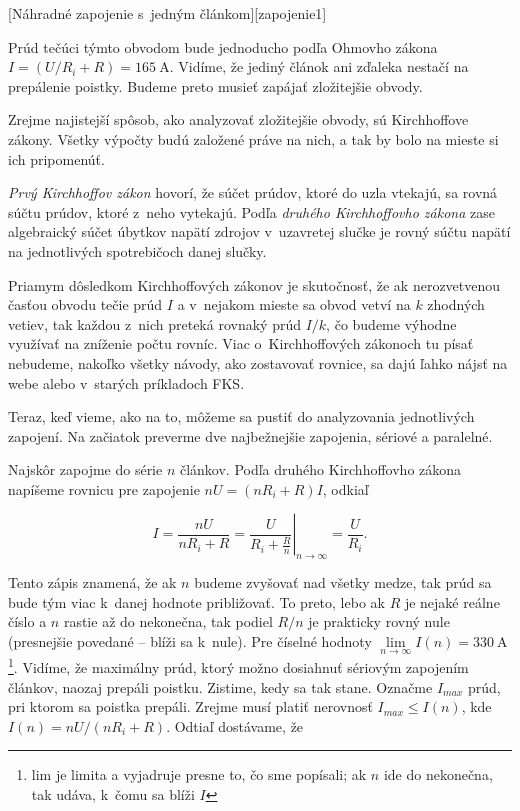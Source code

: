 [Náhradné zapojenie s~jedným článkom][zapojenie1]

Prúd tečúci týmto obvodom bude jednoducho podľa Ohmovho zákona $I=(U/R_{i}+R)=\SI{165}{\ampere}$.
Vidíme, že jediný článok ani zďaleka nestačí na prepálenie poistky.
Budeme preto musieť zapájať zložitejšie obvody.

Zrejme najistejší spôsob, ako analyzovať zložitejšie obvody, sú Kirchhoffove
zákony. Všetky výpočty budú založené práve na nich, a tak by bolo
na mieste si ich pripomenúť. 

\emph{Prvý Kirchhoffov zákon} hovorí, že súčet
prúdov, ktoré do uzla vtekajú, sa rovná súčtu prúdov, ktoré z~neho
vytekajú. Podľa \emph{druhého Kirchhoffovho zákona} zase algebraický súčet
úbytkov napätí zdrojov v~uzavretej slučke je rovný súčtu napätí na
jednotlivých spotrebičoch danej slučky. 

Priamym dôsledkom Kirchhoffových
zákonov je skutočnosť, že ak nerozvetvenou časťou obvodu tečie prúd
$I$ a v~nejakom mieste sa obvod vetví na $k$ zhodných vetiev, tak
každou z~nich preteká rovnaký prúd $I/k$, čo budeme výhodne
využívať na zníženie počtu rovníc. Viac o~Kirchhoffových zákonoch
tu písať nebudeme, nakoľko všetky návody, ako zostavovať rovnice,
sa dajú ľahko nájsť na webe alebo v~starých príkladoch FKS.

Teraz, keď vieme, ako na to, môžeme sa pustiť do analyzovania jednotlivých
zapojení. Na začiatok preverme dve najbežnejšie zapojenia, sériové
a paralelné.




Najskôr zapojme do série $n$ článkov. Podľa druhého Kirchhoffovho zákona napíšeme rovnicu
pre zapojenie $nU=\left(nR_{i}+R\right)I$, odkiaľ

$$I=\frac{nU}{nR_{i}+R}=\left.\frac{U}{R_{i}+\frac{R}{n}}\right|_{n\rightarrow\infty}=\frac{U}{R_{i}}\text{.}$$

Tento zápis znamená, že ak $n$ budeme zvyšovať nad všetky medze,
tak prúd sa bude tým viac k~danej hodnote približovať. To preto, lebo
ak $R$ je nejaké reálne číslo a $n$ rastie až do nekonečna, tak
podiel $R/n$ je prakticky rovný nule (presnejšie povedané --
blíži sa k~nule). Pre číselné hodnoty $\underset{n\rightarrow\infty}{\lim}I\left(n\right)=\SI{330}{\ampere}$\footnote{lim je limita a vyjadruje presne to, čo sme popísali; ak $n$ ide
do nekonečna, tak udáva, k~čomu sa blíži $I$}. Vidíme, že maximálny prúd, ktorý možno dosiahnuť sériovým zapojením
článkov, naozaj prepáli poistku. Zistime, kedy sa tak stane. Označme
$I_{max}$ prúd, pri ktorom sa poistka prepáli. Zrejme musí platiť
nerovnosť $I_{max}\leq I\left(n\right)$, kde $I\left(n\right)=nU/(nR_{i}+R)$.
Odtiaľ dostávame, že 

